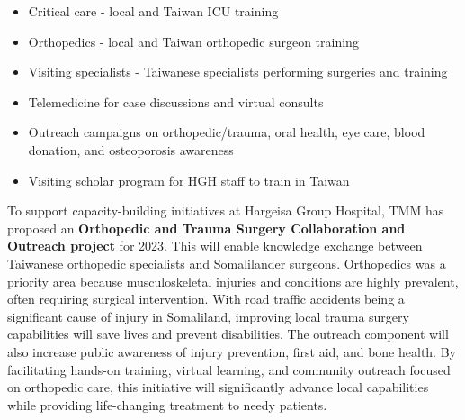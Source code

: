 \documentclass{article}
\begin{document}
\begin{itemize}
\item Critical care - local and Taiwan ICU training
\item Orthopedics - local and Taiwan orthopedic surgeon training
\item Visiting specialists - Taiwanese specialists performing surgeries and training
\item Telemedicine for case discussions and virtual consults
\item Outreach campaigns on orthopedic/trauma, oral health, eye care, blood donation, and osteoporosis awareness
\item Visiting scholar program for HGH staff to train in Taiwan
\end{itemize}



To support capacity-building initiatives at Hargeisa Group Hospital, TMM has proposed an \textbf{Orthopedic and Trauma Surgery Collaboration and Outreach project} for 2023. 
This will enable knowledge exchange between Taiwanese orthopedic specialists and Somalilander surgeons. Orthopedics was a priority area because musculoskeletal injuries and conditions are highly prevalent, often requiring surgical intervention. With road traffic accidents being a significant cause of injury in Somaliland, improving local trauma surgery capabilities will save lives and prevent disabilities. The outreach component will also increase public awareness of injury prevention, first aid, and bone health. By facilitating hands-on training, virtual learning, and community outreach focused on orthopedic care, this initiative will significantly advance local capabilities while providing life-changing treatment to needy patients.
\end{document}
